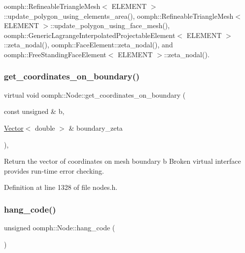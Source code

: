 oomph\+::\+Refineable\+Triangle\+Mesh$<$ E\+L\+E\+M\+E\+N\+T $>$\+::update\+\_\+polygon\+\_\+using\+\_\+elements\+\_\+area(), oomph\+::\+Refineable\+Triangle\+Mesh$<$ E\+L\+E\+M\+E\+N\+T $>$\+::update\+\_\+polygon\+\_\+using\+\_\+face\+\_\+mesh(), oomph\+::\+Generic\+Lagrange\+Interpolated\+Projectable\+Element$<$ E\+L\+E\+M\+E\+N\+T $>$\+::zeta\+\_\+nodal(), oomph\+::\+Face\+Element\+::zeta\+\_\+nodal(), and oomph\+::\+Free\+Standing\+Face\+Element$<$ E\+L\+E\+M\+E\+N\+T $>$\+::zeta\+\_\+nodal().

\mbox{\label{classoomph_1_1Node_a6db0c3e8349aa231c3c56cdbfb720e1c}} 
\subsubsection{\texorpdfstring{get\+\_\+coordinates\+\_\+on\+\_\+boundary()}{get\_coordinates\_on\_boundary()}\hspace{0.1cm}{\footnotesize\ttfamily [2/2]}}
{\footnotesize\ttfamily virtual void oomph\+::\+Node\+::get\+\_\+coordinates\+\_\+on\+\_\+boundary (\begin{DoxyParamCaption}\item[{const unsigned \&}]{b,  }\item[{\hyperlink{classoomph_1_1Vector}{Vector}$<$ double $>$ \&}]{boundary\+\_\+zeta }\end{DoxyParamCaption})\hspace{0.3cm}{\ttfamily [inline]}, {\ttfamily [virtual]}}



Return the vector of coordinates on mesh boundary b Broken virtual interface provides run-\/time error checking. 



Definition at line 1328 of file nodes.\+h.

\mbox{\label{classoomph_1_1Node_aaa5ff8bea22ee29dfad3e631ae454961}} 
\subsubsection{\texorpdfstring{hang\+\_\+code()}{hang\_code()}}
{\footnotesize\ttfamily unsigned oomph\+::\+Node\+::hang\+\_\+code (\begin{DoxyParamCaption}{ }\end{DoxyParamCaption})\hspace{0.3cm}{\ttfamily [inline]}}



